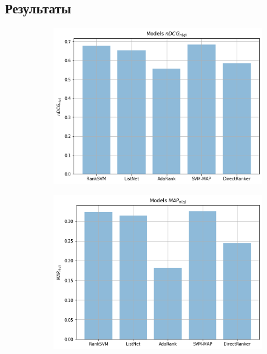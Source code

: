 \documentclass{article}[16pt]
\begin{document}
	\subsection{Результаты}
	\begin{figure}[H]
		\begin{subfigure}{.33\textwidth}
			\includegraphics[width=\textwidth]{images/nDcg.png}
		\end{subfigure}
		\begin{subfigure}{.33\textwidth}
			\includegraphics[width=\textwidth]{images/map.png}
		\end{subfigure}
		\begin{subfigure}{.33\textwidth}

\end{subfigure}
\end{figure}
\end{document}
